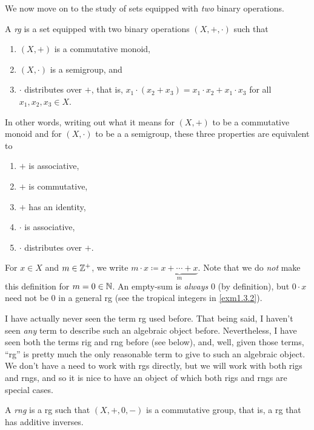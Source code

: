 We now move on to the study of sets equipped with \emph{two} binary operations.
\begin{dfn}[Rg]
A \emph{rg} is a set equipped with two binary operations $(X,+,\cdot )$ such that
\begin{enumerate}
\item $(X,+)$ is a commutative monoid,
\item $(X,\cdot )$ is a semigroup, and
\item $\cdot$ distributes over $+$, that is, $x_1\cdot (x_2+x_3)=x_1\cdot x_2+x_1\cdot x_3$ for all $x_1,x_2,x_3\in X$.
\end{enumerate}
\begin{rmk}
In other words, writing out what it means for $(X,+)$ to be a commutative monoid and for $(X,\cdot )$ to be a a semigroup, these three properties are equivalent to
\begin{enumerate}
\item $+$ is associative,
\item $+$ is commutative,
\item $+$ has an identity,
\item $\cdot$ is associative,
\item $\cdot$ distributes over $+$.
\end{enumerate}
\end{rmk}
\begin{rmk}
For $x\in X$ and $m\in \mathbb{Z} ^+$, we write $m\cdot x\coloneqq \underbrace{x+\cdots +x}_{m}$.  Note that we do \emph{not} make this definition for $m=0\in \mathbb{N}$.  An empty-sum is \emph{always} $0$ (by definition), but $0\cdot x$ need not be $0$ in a general rg (see the tropical integers in \cref{exm1.3.2}).
\end{rmk}
\begin{rmk}
I have actually never seen the term rg used before.  That being said, I haven't seen \emph{any} term to describe such an algebraic object before.  Nevertheless, I have seen both the terms rig and rng before (see below), and, well, given those terms, ``rg'' is pretty much the only reasonable term to give to such an algebraic object.  We don't have a need to work with rgs directly, but we will work with both rigs and rngs, and so it is nice to have an object of which both rigs and rngs are special cases.
\end{rmk}
\end{dfn}
\begin{dfn}[Rng]\label{dfnA.1.86}
A \emph{rng} is a rg such that $(X,+,0,-)$ is a commutative group, that is, a rg that has additive inverses.
\end{dfn}
